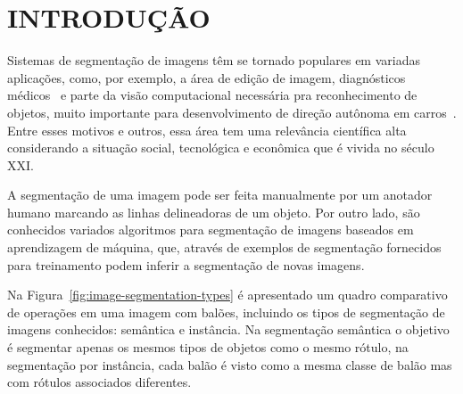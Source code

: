 \chapter{INTRODUÇÃO}\label{cap:introducao}

Sistemas de segmentação de imagens têm se tornado populares em
variadas aplicações, como, por exemplo, a área de edição de imagem,
diagnósticos médicos~\cite{zhou2019interactive} e parte da visão
computacional necessária pra reconhecimento de objetos, muito
importante para desenvolvimento de direção autônoma em
carros~\cite{feng2021review}. Entre esses motivos e outros, essa área
tem uma relevância científica alta considerando a situação social,
tecnológica e econômica que é vivida no século XXI.\@

A segmentação de uma imagem pode ser feita manualmente por um anotador
humano marcando as linhas delineadoras de um objeto. Por outro lado,
são conhecidos variados algoritmos para segmentação de imagens baseados
em aprendizagem de máquina, que, através de exemplos de segmentação
fornecidos para treinamento podem inferir a segmentação de novas imagens.

Na Figura~\ref{fig:image-segmentation-types} é apresentado um quadro
comparativo de operações em uma imagem com balões, incluindo os tipos
de segmentação de imagens conhecidos: semântica e instância. Na
segmentação semântica o objetivo é segmentar apenas os mesmos tipos de
objetos como o mesmo rótulo, na segmentação por instância, cada balão
é visto como a mesma classe de balão mas com rótulos associados diferentes.

\begin{figure}[h!]
        \captionsetup{width=16cm}
		\centering
\end{figure}


